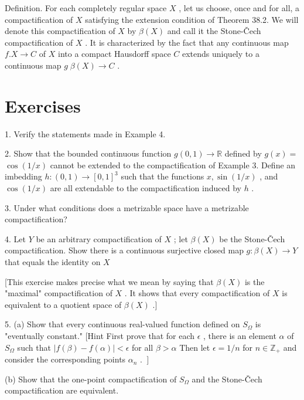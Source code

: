 Definition. For each completely regular space \(X\) , let us choose, once and for all, a compactification of \(X\) satisfying the extension condition of Theorem 38.2. We will denote this compactification of \(X\) by \(\beta \left( X\right)\) and call it the Stone-Čech compactification of \(X\) . It is characterized by the fact that any continuous map \(f.X \rightarrow  C\) of \(X\) into a compact Hausdorff space \(C\) extends uniquely to a continuous map \(g\;\beta \left( X\right)  \rightarrow  C\) .

\section*{Exercises}

1. Verify the statements made in Example 4.

2. Show that the bounded continuous function \(g\left( {0,1}\right)  \rightarrow  \mathbb{R}\) defined by \(g\left( x\right)  =\)  \(\cos \left( {1/x}\right)\) cannot be extended to the compactification of Example 3. Define an imbedding \(h : \left( {0,1}\right)  \rightarrow  {\left\lbrack  0,1\right\rbrack  }^{3}\) such that the functions \(x,\sin \left( {1/x}\right)\) , and \(\cos \left( {1/x}\right)\) are all extendable to the compactification induced by \(h\) .

3. Under what conditions does a metrizable space have a metrizable compactification?

4. Let \(Y\) be an arbitrary compactification of \(X\) ; let \(\beta \left( X\right)\) be the Stone-Čech compactification. Show there is a continuous surjective closed map \(g : \beta \left( X\right)  \rightarrow  Y\) that equals the identity on \(X\)

[This exercise makes precise what we mean by saying that \(\beta \left( X\right)\) is the "maximal" compactification of \(X\) . It shows that every compactification of \(X\) is equivalent to a quotient space of \(\beta \left( X\right)\) .]

5. (a) Show that every continuous real-valued function defined on \({S}_{\Omega }\) is "eventually constant." [Hint First prove that for each \(\epsilon\) , there is an element \(\alpha\) of \({S}_{\Omega }\) such that \(\left| {f\left( \beta \right)  - f\left( \alpha \right) }\right|  < \epsilon\) for all \(\beta  > \alpha\) Then let \(\epsilon  = 1/n\) for \(n \in  {\mathbb{Z}}_{ + }\) and consider the corresponding points \(\left. {{\alpha }_{n}\text{ . }}\right\rbrack\)

(b) Show that the one-point compactification of \({S}_{\Omega }\) and the Stone-Čech compactification are equivalent.

